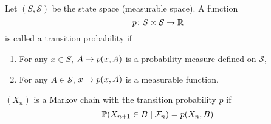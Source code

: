 \begin{defn}
    Let $(S,\mathcal{S})$ be the state space (measurable space). A function
    \begin{equation*}
        p \colon S \times \mathcal{S} \rightarrow \mathbb{R}
    \end{equation*}
    is called a transition probability if
    \begin{enumerate}[label=(\roman*)]
        \item For any $x \in S$, $A \rightarrow p(x,A)$ is a probability measure defined on $\mathcal{S}$,
        \item For any $A \in \mathcal{S}$, $x \rightarrow p(x,A)$ is a measurable function.
    \end{enumerate}
    $(X_n)$ is a Markov chain with the transition probability $p$ if
    \begin{equation*}
        \mathbb{P}(X_{n+1} \in B \mid \mathcal{F}_n)= p(X_n, B)
    \end{equation*}
\end{defn}

